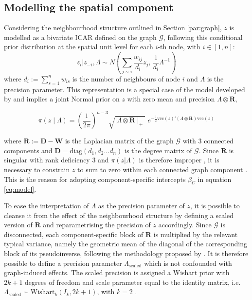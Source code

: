 \documentclass[openany]{book}
\begin{document}
\subsection{Modelling the spatial component} \label{par:ICAR}
Considering the neighbourhood structure outlined in Section \ref{par:graph}, $z$ is modelled as a bivariate ICAR defined on the graph $\mathcal{G}$, following this conditional prior distribution at the spatial unit level for each $i$-th node, with $i \in [1, n]$:
\begin{equation}
z_{i} | z_{-i}, \Lambda \sim N \left(\sum_{j \sim i} \frac{w_{ij}}{d_i} z_{j}, \, \frac{1}{d_i} \Lambda^{-1}\right)
\label{eq:ICAR_local}
\end{equation}
where  $d_i := \sum_{s=1}^n w_{is}$ is the number of neighbours of node $i$ and $\Lambda$ is the precision parameter. This representation is a special case of the model developed by \citep[][theorem 2.1, corollary 2]{Mardia} and implies a joint Normal prior on $z$ with zero mean and precision $\Lambda \otimes \mathbf{R}$,

\begin{equation}
\pi\left(z\mid \Lambda \right) =
\left( \frac{1}{2 \pi} \right)^{n-3}\sqrt{\mid \Lambda \otimes\mathbf{R}  \mid_{+}} \, \, 
 e^{\displaystyle{-\tfrac{1}{2}
\mathrm{vec}(z)'(\Lambda \otimes \mathbf{R} ) \mathrm{vec}(z)}}
\label{eq:ICAR}
\end{equation}

where $\mathbf{R} := \mathbf{D} - \mathbf{W}$ is the Laplacian matrix of the graph $\mathcal{G}$ with $3$ connected components and $\mathbf{D} = \mathrm{diag}(d_1, d_2 \ldots d_n)$ is the degree matrix of $\mathcal{G}$.
Since $\mathbf{R}$ is singular with rank deficiency $3$ and $\pi(z|\Lambda)$ is therefore improper \citep{Hodges2003}, it is necessary to constrain $z$ to sum to zero within each connected graph component \citep{ICAR}. 
This is the reason for adopting component-specific intercepts $\beta_C$ in equation \ref{eq:model}.

To ease the interpretation of $\Lambda$ as the precision parameter of $z$, it is possible to cleanse it from the effect of the neighbourhood structure by defining a scaled version of $\mathbf{R}$ \cite{Sorbye} and reparametrising the precision of $z$ accordingly.
Since $\mathcal{G}$ is disconnected, each component-specific block of $\mathbf{R}$ is multiplied by the relevant typical variance, namely the geometric mean of the diagonal of the corresponding block of its pseudoinverse, following the methodology proposed by \cite{Freni}. It is therefore possible to define a precision parameter $\Lambda_\mathrm{scaled}$ which is not confounded with graph-induced effects. The scaled precision is assigned a Wishart prior \citep{Gelman} with $2k+1$ degrees of freedom and scale parameter equal to the identity matrix, i.e. $\Lambda_\mathrm{scaled} \sim \mathrm{Wishart}_{k}( I_k, 2k+1)$, with $k=2$ \citep{INLAMSM}.
\end{document}
